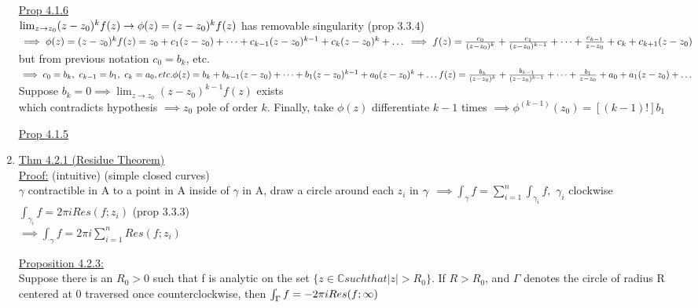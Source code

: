 \documentclass[12pt]{amsart}
\begin{document}
\begin{enumerate}
\underline{Prop 4.1.6}\\
$\lim_{z \rightarrow z_0} (z-z_0)^k f(z) \rightarrow \phi(z) = (z-z_0)^k f(z)\\$
has removable singularity (prop 3.3.4)\\
$\implies \phi(z) = (z-z_0)^k f(z) = z_0 + c_1(z-z_0)+ \dots + c_{k-1} (z-z_0)^{k-1} + c_k (z-z_0)^k + \dots\\
\implies f(z) = \frac{c_0}{(z-z_0)^k} + \frac{c_1}{(z-z_0)^{k-1}} + \dots + \frac{c_{k-1}}{z-z_0} + c_k + c_{k+1} (z-z_0)\\$
but from previous notation $c_0=b_k$, etc.\\
$\implies c_0 = b_k,\,\, c_{k-1} = b_1,\,\, c_k = a_0, etc.\\
\phi(z) = b_k + b_{k-1} (z-z_0) + \dots + b_1 (z-z_0)^{k-1} + a_0(z-z_0)^k + \dots\\
f(z) = \frac{b_k}{(z-z_0)^k} + \frac{b_{k-1}}{(z-z_0)^{k-1}} + \dots + \frac{b_1}{z-z_0} + a_0 + a_1(z-z_0) + \dots\\$
Suppose $b_k = 0 \implies \lim_{z \rightarrow z_0} (z-z_0)^{k-1} f(z)$ exists\\
which contradicts hypothesis $\implies z_0$ pole of order $k$. Finally, take $\phi(z)$ differentiate $k-1$ times $\implies \phi^{(k-1)}(z_0) = [(k-1)!] b_1$


\underline{Prop 4.1.5}\\


\hdashrule[0.5ex][c]{\linewidth}{0.5pt}{1.5mm}


\item \underline{Thm 4.2.1 (Residue Theorem)}\\
\underline{Proof:} (intuitive) (simple closed curves)\\
$\gamma$ contractible in A to a point in A inside of $\gamma$ in A, draw a circle around each $z_i$ in $\gamma\\$
$\implies \int_{\gamma} f = \sum_{i=1}^n \int_{\gamma_i}f,\,\, \gamma_i$ clockwise\\
$\int_{\gamma_i} f = 2 \pi i Res(f;z_i)$ (prop 3.3.3)\\
$\implies \int_{\gamma} f = 2 \pi i \sum_{i=1}^n Res(f;z_i)$\\


\hdashrule[0.5ex][c]{\linewidth}{0.5pt}{1.5mm}


\underline{Proposition 4.2.3:}\\
Suppose there is an $R_0 >0$ such that f is analytic on the set $\{ z \in \mathbb{C} such that |z| > R_0 \}$. If $R> R_0$, and $\Gamma$ denotes the circle of radius R centered at 0 traversed once counterclockwise, then $\int_{\Gamma} f = - 2 \pi i Res(f; \infty)\\$


\end{enumerate}
\end{document}
